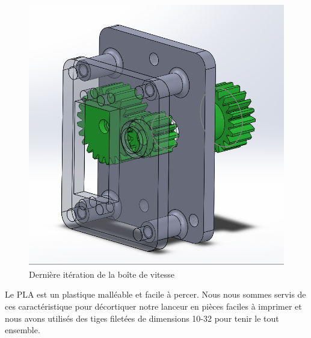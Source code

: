 \begin{figure}[h!]
    \centering
    \includegraphics[width=0.5\linewidth]{img/s2/cad/gearbox2}
    \caption{Dernière itération de la boîte de vitesse}
    \label{fig:s2-cad-gearbox2}
\end{figure}


Le PLA est un plastique malléable et facile à percer.
Nous nous sommes servis de ces caractéristique pour décortiquer notre lanceur en pièces faciles à imprimer et nous avons utilisés des tiges filetées de dimensions 10-32 pour tenir le tout ensemble.

